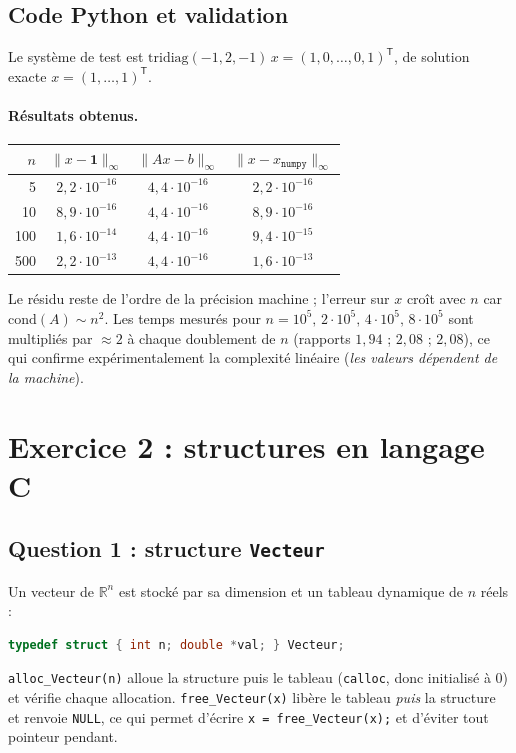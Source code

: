 \documentclass[11pt,a4paper]{article}
\newcommand{\R}{\mathbb{R}}
\newcommand{\T}{\mathsf{T}}
\begin{document}
\subsection{Code Python et validation}

Le système de test est $\mathrm{tridiag}(-1,2,-1)\,x=(1,0,\dots,0,1)^\T$, de solution exacte $x=(1,\dots,1)^\T$.



\paragraph{Résultats obtenus.}
\begin{center}
\begin{tabular}{rccc}
\toprule
$n$ & $\|x-\mathbf 1\|_\infty$ & $\|Ax-b\|_\infty$ & $\|x-x_{\texttt{numpy}}\|_\infty$\\
\midrule
5   & $2{,}2\cdot10^{-16}$ & $4{,}4\cdot10^{-16}$ & $2{,}2\cdot10^{-16}$\\
10  & $8{,}9\cdot10^{-16}$ & $4{,}4\cdot10^{-16}$ & $8{,}9\cdot10^{-16}$\\
100 & $1{,}6\cdot10^{-14}$ & $4{,}4\cdot10^{-16}$ & $9{,}4\cdot10^{-15}$\\
500 & $2{,}2\cdot10^{-13}$ & $4{,}4\cdot10^{-16}$ & $1{,}6\cdot10^{-13}$\\
\bottomrule
\end{tabular}
\end{center}
Le résidu reste de l'ordre de la précision machine ; l'erreur sur $x$ croît avec $n$ car
$\mathrm{cond}(A)\sim n^2$. Les temps mesurés pour $n=10^5,\,2\cdot10^5,\,4\cdot10^5,\,8\cdot10^5$
sont multipliés par $\approx 2$ à chaque doublement de $n$ (rapports $1{,}94$ ; $2{,}08$ ; $2{,}08$), ce qui confirme
expérimentalement la complexité linéaire (\emph{les valeurs dépendent de la machine}).

\section{Exercice 2 : structures en langage C}

\subsection{Question 1 : structure \texttt{Vecteur}}
Un vecteur de $\R^n$ est stocké par sa dimension et un tableau dynamique de $n$ réels :
\begin{lstlisting}[language=C]
typedef struct { int n; double *val; } Vecteur;
\end{lstlisting}
\texttt{alloc\_Vecteur(n)} alloue la structure puis le tableau (\texttt{calloc}, donc initialisé à $0$) et vérifie
chaque allocation. \texttt{free\_Vecteur(x)} libère le tableau \emph{puis} la structure et renvoie \texttt{NULL},
ce qui permet d'écrire \texttt{x = free\_Vecteur(x);} et d'éviter tout pointeur pendant.
\end{document}
